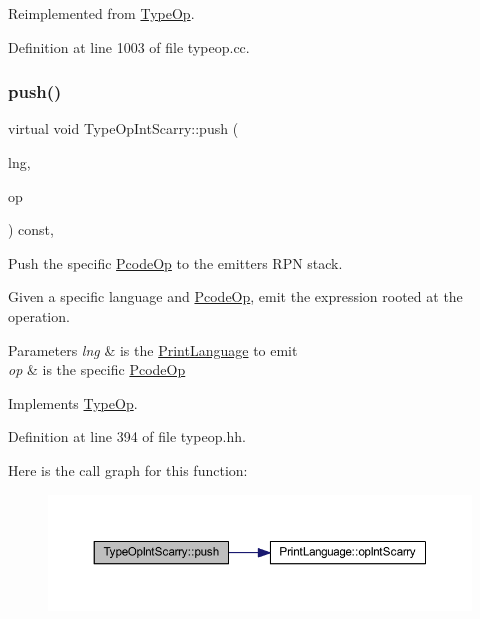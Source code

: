Reimplemented from \mbox{\hyperlink{class_type_op_a42a1ffa77f998df24efdb44405b33ac5}{Type\+Op}}.



Definition at line 1003 of file typeop.\+cc.

\mbox{\label{class_type_op_int_scarry_a371c4edf70f55a60974caf98b6c7638f}} 
\subsubsection{\texorpdfstring{push()}{push()}}
{\footnotesize\ttfamily virtual void Type\+Op\+Int\+Scarry\+::push (\begin{DoxyParamCaption}\item[{\mbox{\hyperlink{class_print_language}{Print\+Language}} $\ast$}]{lng,  }\item[{const \mbox{\hyperlink{class_pcode_op}{Pcode\+Op}} $\ast$}]{op }\end{DoxyParamCaption}) const\hspace{0.3cm}{\ttfamily [inline]}, {\ttfamily [virtual]}}



Push the specific \mbox{\hyperlink{class_pcode_op}{Pcode\+Op}} to the emitter\textquotesingle{}s R\+PN stack. 

Given a specific language and \mbox{\hyperlink{class_pcode_op}{Pcode\+Op}}, emit the expression rooted at the operation. 
\begin{DoxyParams}{Parameters}
{\em lng} & is the \mbox{\hyperlink{class_print_language}{Print\+Language}} to emit \\
\hline
{\em op} & is the specific \mbox{\hyperlink{class_pcode_op}{Pcode\+Op}} \\
\hline
\end{DoxyParams}


Implements \mbox{\hyperlink{class_type_op_ac9c9544203ed74dabe6ac662b653b2af}{Type\+Op}}.



Definition at line 394 of file typeop.\+hh.

Here is the call graph for this function\+:
\nopagebreak
\begin{figure}[H]
\begin{center}
\leavevmode
\includegraphics[width=350pt]{class_type_op_int_scarry_a371c4edf70f55a60974caf98b6c7638f_cgraph}
\end{center}
\end{figure}


